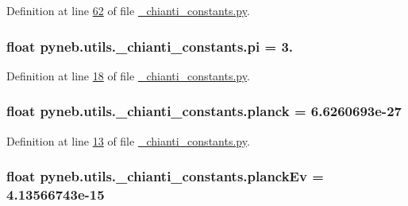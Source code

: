 Definition at line \hyperlink{__chianti__constants_8py_source_l00062}{62} of file \hyperlink{__chianti__constants_8py_source}{\+\_\+chianti\+\_\+constants.\+py}.

\hypertarget{namespacepyneb_1_1utils_1_1__chianti__constants_ad25c8208e2cf163e8bc97367e09e07a8}{}
\subsubsection[{pi}]{\setlength{\rightskip}{0pt plus 5cm}float pyneb.\+utils.\+\_\+chianti\+\_\+constants.\+pi = 3.}\label{namespacepyneb_1_1utils_1_1__chianti__constants_ad25c8208e2cf163e8bc97367e09e07a8}


Definition at line \hyperlink{__chianti__constants_8py_source_l00018}{18} of file \hyperlink{__chianti__constants_8py_source}{\+\_\+chianti\+\_\+constants.\+py}.

\hypertarget{namespacepyneb_1_1utils_1_1__chianti__constants_a7a52a58fab4374274ebc5466bbd1b2a1}{}
\subsubsection[{planck}]{\setlength{\rightskip}{0pt plus 5cm}float pyneb.\+utils.\+\_\+chianti\+\_\+constants.\+planck = 6.\+6260693e-\/27}\label{namespacepyneb_1_1utils_1_1__chianti__constants_a7a52a58fab4374274ebc5466bbd1b2a1}


Definition at line \hyperlink{__chianti__constants_8py_source_l00013}{13} of file \hyperlink{__chianti__constants_8py_source}{\+\_\+chianti\+\_\+constants.\+py}.

\hypertarget{namespacepyneb_1_1utils_1_1__chianti__constants_ae1ab6400d7b260ee4a719f00435fc2ab}{}
\subsubsection[{planck\+Ev}]{\setlength{\rightskip}{0pt plus 5cm}float pyneb.\+utils.\+\_\+chianti\+\_\+constants.\+planck\+Ev = 4.\+13566743e-\/15}\label{namespacepyneb_1_1utils_1_1__chianti__constants_ae1ab6400d7b260ee4a719f00435fc2ab}


